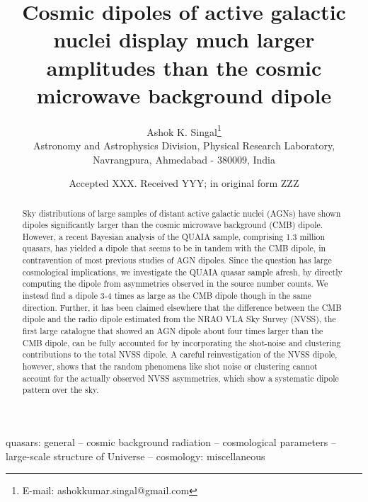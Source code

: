 \documentclass[fleqn,usenatbib]{mnras}
\title[Cosmic AGN dipoles are much larger than CMB dipole]
{Cosmic dipoles of active galactic nuclei display much larger amplitudes than the cosmic microwave background dipole}
\author[A. K. Singal]{Ashok K. Singal\thanks{E-mail: ashokkumar.singal@gmail.com}\\
{Astronomy and Astrophysics Division, Physical Research Laboratory, 
Navrangpura, Ahmedabad - 380009, India}}
\date{Accepted XXX. Received YYY; in original form ZZZ}
\begin{document}
\label{firstpage}
\pagerange{\pageref{firstpage}--\pageref{lastpage}}
\maketitle

\begin{abstract}
Sky distributions of large samples of distant active galactic nuclei (AGNs) have shown dipoles significantly larger than the cosmic microwave background (CMB) dipole.
However, a recent Bayesian analysis of the QUAIA sample, comprising 1.3 million quasars, has yielded a dipole that seems to be in tandem with the CMB dipole, in contravention of most previous studies of AGN dipoles. Since the question has large cosmological implications, we investigate the QUAIA quasar sample afresh, by directly computing the dipole from asymmetries observed in the source number counts. We instead find a dipole 3-4 times as large as the CMB dipole though in the same direction. Further, it has been claimed elsewhere that the difference between the CMB dipole and the radio dipole estimated from the NRAO VLA Sky Survey (NVSS), the first large catalogue that showed an AGN dipole about four times larger than the CMB dipole, can be fully accounted for by incorporating the shot-noise and clustering contributions to the total NVSS dipole. A careful reinvestigation of the NVSS dipole, however, shows that the random phenomena like shot noise or clustering cannot account for the actually observed NVSS asymmetries, which show a systematic dipole   pattern over the sky.
\end{abstract}
\begin{keywords}
quasars: general -- cosmic background radiation -- cosmological parameters -- large-scale structure of Universe -- cosmology: miscellaneous
\end{keywords}
\end{document}
